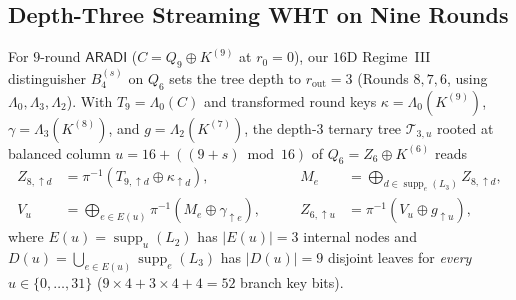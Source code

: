 \documentclass[11pt,a4paper]{article}
\theoremstyle{definition}
\theoremstyle{remark}
\newcommand{\ARADI}{\mathsf{ARADI}}
\newcommand{\supp}{\operatorname{supp}}
\begin{document}
\subsection{Depth-Three Streaming WHT on Nine Rounds}
\label{subsec:depth3}
\label{subsec:9r}

For $9$-round $\ARADI$ ($C = Q_9 \oplus K^{(9)}$ at $r_0 = 0$), our $16$D Regime~III distinguisher $B_4^{(s)}$ on $Q_6$ sets the tree depth to $r_{\text{out}} = 3$ (Rounds $8, 7, 6$, using $\Lambda_0, \Lambda_3, \Lambda_2$). With $T_9 = \Lambda_0(C)$ and transformed round keys $\kappa = \Lambda_0(K^{(9)})$, $\gamma = \Lambda_3(K^{(8)})$, and $g = \Lambda_2(K^{(7)})$, the depth-$3$ ternary tree $\mathcal{T}_{3, u}$ rooted at balanced column $u = 16 + ((9 + s)\bmod 16)$ of $Q_6 = Z_6 \oplus K^{(6)}$ reads
\begin{equation}
\label{eq:9r-peel}
\begin{aligned}
Z_{8,\uparrow d} &= \pi^{-1}(T_{9,\uparrow d} \oplus \kappa_{\uparrow d}), &\qquad
M_e &= \bigoplus_{d \in \supp_e(L_3)} Z_{8,\uparrow d}, \\
V_u &= \bigoplus_{e \in E(u)} \pi^{-1}(M_e \oplus \gamma_{\uparrow e}), &\qquad
Z_{6,\uparrow u} &= \pi^{-1}(V_u \oplus g_{\uparrow u}),
\end{aligned}
\end{equation}
where $E(u) = \supp_u(L_2)$ has $|E(u)| = 3$ internal nodes and $D(u) = \bigcup_{e \in E(u)} \supp_e(L_3)$ has $|D(u)| = 9$ disjoint leaves for \emph{every} $u \in \{0,\dots,31\}$ ($9 \times 4 + 3 \times 4 + 4 = 52$ branch key bits).
\end{document}
